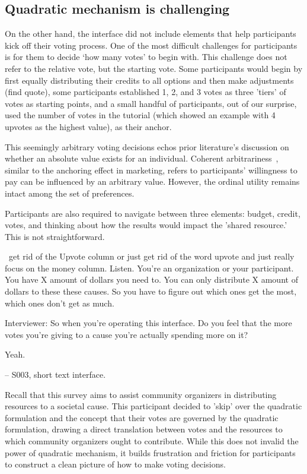 \subsection{Quadratic mechanism is challenging}
On the other hand, the interface did not include elements that help participants kick off their voting process. One of the most difficult challenges for participants is for them to decide `how many votes' to begin with. This challenge does not refer to the relative vote, but the starting vote. Some participants would begin by first equally distributing their credits to all options and then make adjustments (find quote), some participants established 1, 2, and 3 votes as three 'tiers' of votes as starting points, and a small handful of participants, out of our surprise, used the number of votes in the tutorial (which showed an example with 4 upvotes as the highest value), as their anchor. 

This seemingly arbitrary voting decisions echos prior literature's discussion on whether an absolute value exists for an individual. Coherent arbitrariness~\cite{arielyCoherentArbitrarinessStable2003}, similar to the anchoring effect in marketing, refers to participants' willingness to pay can be influenced by an arbitrary value. However, the ordinal utility remains intact among the set of preferences. 

Participants are also required to navigate between three elements: budget, credit, votes, and thinking about how the results would impact the 'shared resource.' This is not straightforward. 

\begin{displayquote}

~\bracketellipsis get rid of the Upvote column or just get rid of the word upvote and just really focus on the money column. Listen. You're an organization or your participant. You have X amount of dollars you need to. You can only distribute X amount of dollars to these these causes. So you have to figure out which ones get the most, which ones don't get as much.~\bracketellipsis 

Interviewer: So when you're operating this interface. Do you feel that the more votes you're giving to a cause you're actually spending more on it?

Yeah.
       
\noindent \hfill -- S003, short text interface.
\end{displayquote}
Recall that this survey aims to assist community organizers in distributing resources to a societal cause. This participant decided to 'skip' over the quadratic formulation and the concept that their votes are governed by the quadratic formulation, drawing a direct translation between votes and the resources to which community organizers ought to contribute. While this does not invalid the power of quadratic mechanism, it builds frustration and friction for participants to construct a clean picture of how to make voting decisions. 

